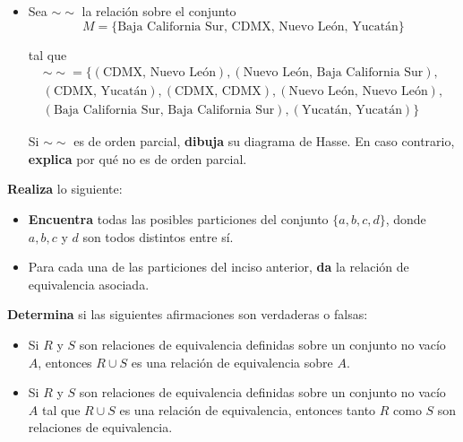 \documentclass[oneside]{style}
\begin{document}
\begin{questions}[label=\protect\circled{\bfseries\arabic*}]
{\begin{itemize}
            \item Sea $\sim \sim$ la relación sobre el conjunto 
            \begin{equation*}
                M = \{\text{Baja California Sur, CDMX, Nuevo León, Yucatán}\} 
            \end{equation*}

            tal que 
            \begin{align*}
                \sim \sim = \{(\text{CDMX, Nuevo León}), (\text{Nuevo León, 
                Baja California Sur}), \\ (\text{CDMX, Yucatán}),(\text{CDMX,
                CDMX}),(\text{Nuevo León, Nuevo León}), \\ (\text{Baja 
                California Sur, Baja California Sur}), (\text{Yucatán, 
                Yucatán})\} 
            \end{align*}

            Si $\sim \sim$ es de orden parcial, \textbf{dibuja} su diagrama de 
            Hasse. En caso contrario, \textbf{explica} por qué no es de orden 
            parcial. 
        \end{itemize}
    }

    \question
    {
        \textbf{Realiza} lo siguiente:
        \begin{itemize}
            \item \textbf{Encuentra} todas las posibles particiones del conjunto
            $\{a,b,c,d\}$, donde $a,b,c$ y $d$ son todos distintos entre sí.

            \item Para cada una de las particiones del inciso anterior, 
            \textbf{da} la relación de equivalencia asociada. 
        \end{itemize}
    }

    \question
    {
        \textbf{Determina} si las siguientes afirmaciones son verdaderas o 
        falsas:
        \begin{itemize}
            \item Si $R$ y $S$ son relaciones de equivalencia definidas sobre 
            un conjunto no vacío $A$, entonces $R \cup S$ es una relación de 
            equivalencia sobre $A$.

            \item Si $R$ y $S$ son relaciones de equivalencia definidas sobre 
            un conjunto no vacío $A$ tal que $R \cup S$ es una relación de 
            equivalencia, entonces tanto $R$ como $S$ son relaciones de 
            equivalencia. 
        \end{itemize}
    }


\end{questions}
\end{document}
